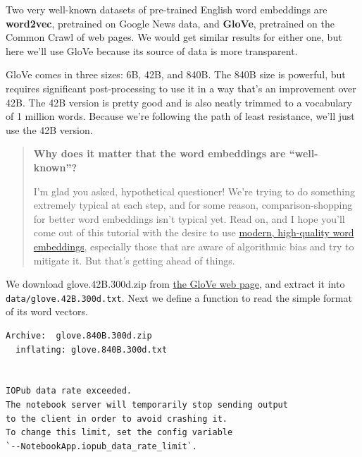 \documentclass[]{book}
\newenvironment{Shaded}{\begin{snugshade}}{\end{snugshade}}
\newcommand{\FunctionTok}[1]{\textcolor[rgb]{0.00,0.00,0.00}{#1}}
\newcommand{\BuiltInTok}[1]{#1}
\newcommand{\ExtensionTok}[1]{#1}
\newcommand{\NormalTok}[1]{#1}
\theoremstyle{definition}
\theoremstyle{definition}
\theoremstyle{definition}
\theoremstyle{remark}
\begin{document}
Two very well-known datasets of pre-trained English word embeddings are
\textbf{word2vec}, pretrained on Google News data, and \textbf{GloVe},
pretrained on the Common Crawl of web pages. We would get similar
results for either one, but here we'll use GloVe because its source of
data is more transparent.

GloVe comes in three sizes: 6B, 42B, and 840B. The 840B size is
powerful, but requires significant post-processing to use it in a way
that's an improvement over 42B. The 42B version is pretty good and is
also neatly trimmed to a vocabulary of 1 million words. Because we're
following the path of least resistance, we'll just use the 42B version.

\begin{quote}
\textbf{Why does it matter that the word embeddings are ``well-known''?}

I'm glad you asked, hypothetical questioner! We're trying to do
something extremely typical at each step, and for some reason,
comparison-shopping for better word embeddings isn't typical yet. Read
on, and I hope you'll come out of this tutorial with the desire to use
\href{https://github.com/commonsense/conceptnet-numberbatch}{modern,
high-quality word embeddings}, especially those that are aware of
algorithmic bias and try to mitigate it. But that's getting ahead of
things.
\end{quote}

We download glove.42B.300d.zip from
\href{https://nlp.stanford.edu/projects/glove/}{the GloVe web page}, and
extract it into \texttt{data/glove.42B.300d.txt}. Next we define a
function to read the simple format of its word vectors.

\begin{Shaded}
\end{Shaded}

\begin{verbatim}
Archive:  glove.840B.300d.zip
  inflating: glove.840B.300d.txt     


IOPub data rate exceeded.
The notebook server will temporarily stop sending output
to the client in order to avoid crashing it.
To change this limit, set the config variable
`--NotebookApp.iopub_data_rate_limit`.
\end{verbatim}
\end{document}

